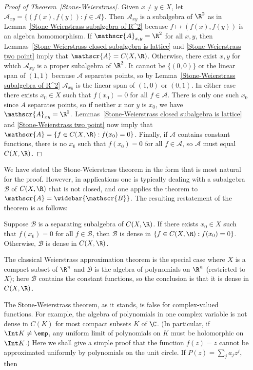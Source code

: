\begin{proof}[Proof of Theorem~\ref{Stone-Weierstrass}]
Given $x\neq y\in X$, let $\mathscr{A}_{xy}=\{(f(x),f(y)):f\in\mathscr{A}\}$. Then $\mathscr{A}_{xy}$ is a subalgebra of $\R^2$ as in Lemma~\ref{Stone-Weierstrass subalgebra of R^2} because $f\mapsto(f(x),f(y))$ is an algebra homomorphism. If $\mathscr{A}_{x,y}=\R^2$ for all $x,y$, then Lemmas~\ref{Stone-Weierstrass closed subalgebra is lattice} and \ref{Stone-Weierstrass two point} imply that $\mathscr{A}=C(X,\R)$. Otherwise, there exist $x,y$ for which $\mathscr{A}_{xy}$ is a proper subalgebra of $\R^2$. It cannot be $\{(0,0)\}$ or the linear span of $(1,1)$ because $\mathscr{A}$ separates points, so by Lemma~\ref{Stone-Weierstrass subalgebra of R^2} $\mathscr{A}_{xy}$ is the linear span of $(1,0)$ or $(0,1)$. In either case there exists $x_0\in X$ such that $f(x_0)=0$ for all $f\in\mathscr{A}$. There is only one such $x_0$ since $A$ separates points, so if neither $x$ nor $y$ is $x_0$, we have $\mathscr{A}_{xy}=\R^2$. Lemmas~\ref{Stone-Weierstrass closed subalgebra is lattice} and \ref{Stone-Weierstrass two point} now imply that $\mathscr{A}=\{f\in C(X,\R):f(x_0)=0\}$. Finally, if $\mathscr{A}$ contains constant functions, there is no $x_0$ such that $f(x_0)=0$ for all $f\in\mathscr{A}$, so $\mathscr{A}$ must equal $C(X,\R)$.
\end{proof}
We have stated the Stone-Weierstrass theorem in the form that is most natural for the proof. However, in applications one is typically dealing with a subalgebra $\mathscr{B}$ of $C(X,\R)$ that is not closed, and one applies the theorem to $\mathscr{A}=\widebar{\mathscr{B}}$. The resulting
restatement of the theorem is as follows:
\begin{corollary}
Suppose $\mathscr{B}$ is a separating subalgebra of $C(X,\R)$. If there exists $x_0\in X$ such that $f(x_0)=0$ for all $f\in\mathscr{B}$, then $\mathscr{B}$ is dense in $\{f\in C(X,\R):f(x_0)=0\}$. Otherwise, $\mathscr{B}$ is dense in $C(X,\R)$.
\end{corollary}
The classical Weierstrass approximation theorem is the special case where $X$ is a compact subset of $\R^n$ and $\mathscr{B}$ is the algebra of polynomials on $\R^n$ (restricted to $X$); here $\mathscr{B}$ contains the constant functions, so the conclusion is that it is dense in $C(X,\R)$.\par
The Stone-Weierstrass theorem, as it stands, is false for complex-valued functions. For example, the algebra of polynomials in one complex variable is not dense in $C(K)$ for most compact subsets $K$ of $\C$. (In particular, if $\Int K\neq\emp$, any uniform limit of polynomials on $K$ must be holomorphic on $\Int K$.) Here we shall give a simple proof that the function $f(z)=\bar{z}$ cannot be approximated uniformly by polynomials on the unit circle. If $P(z)=\sum_ja_jz^j$, then
